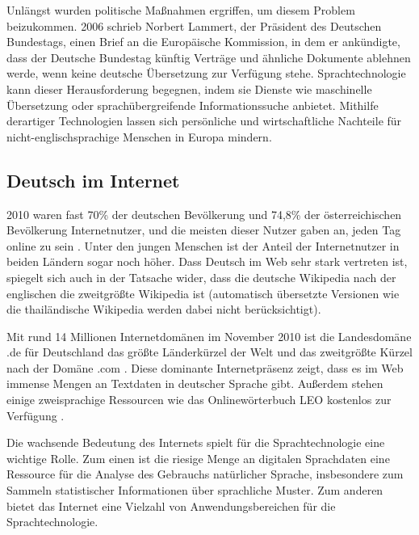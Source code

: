 \begin{multicols}{2}

Unlängst wurden politische Maßnahmen ergriffen, um diesem Problem beizukommen. 2006 schrieb Norbert Lammert, der Präsident des Deutschen Bundestags, einen Brief an die Europäische Kommission, in dem er ankündigte, dass der Deutsche Bundestag künftig Verträge und ähnliche Dokumente ablehnen werde, wenn keine deutsche Übersetzung zur Verfügung stehe. Sprachtechnologie kann dieser Herausforderung begegnen, indem sie Dienste wie maschinelle Übersetzung oder sprachübergreifende Informationssuche anbietet. Mithilfe derartiger Technologien lassen sich persönliche und wirtschaftliche Nachteile für nicht-englischsprachige Menschen in Europa mindern.

\subsection{Deutsch im Internet}

2010 waren fast 70\% der deutschen Bevölkerung und 74,8\% der österreichischen Bevölkerung Internetnutzer, und die meisten dieser Nutzer gaben an, jeden Tag online zu sein \cite{ard1,ict1}. Unter den jungen Menschen ist der Anteil der Internetnutzer in beiden Ländern sogar noch höher. Dass Deutsch im Web sehr stark vertreten ist, spiegelt sich auch in der Tatsache wider, dass die deutsche Wikipedia nach der englischen die zweitgrößte Wikipedia ist (automatisch übersetzte Versionen wie die thailändische Wikipedia werden dabei nicht berücksichtigt).


Mit rund 14 Millionen Internetdomänen im November 2010 ist die Landesdomäne .de für Deutschland das größte Länderkürzel der Welt und das zweitgrößte Kürzel nach der Domäne .com \cite{denic1,ebrands1}. Diese dominante Internetpräsenz zeigt, dass es im Web immense Mengen an Textdaten in deutscher Sprache gibt. Außerdem stehen einige zweisprachige Ressourcen wie das Onlinewörterbuch LEO kostenlos zur Verfügung \cite{leo1}.

Die wachsende Bedeutung des Internets spielt für die Sprachtechnologie eine wichtige Rolle. Zum einen ist die riesige Menge an digitalen Sprachdaten eine Ressource für die Analyse des Gebrauchs natürlicher Sprache, insbesondere zum Sammeln statistischer Informationen über sprachliche Muster. Zum anderen bietet das Internet eine Vielzahl von Anwendungsbereichen für die Sprachtechnologie.


\end{multicols}

